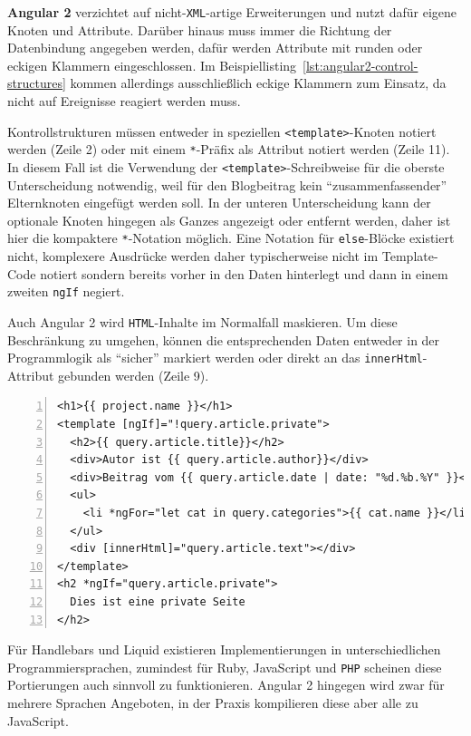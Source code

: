 \textbf{Angular 2} verzichtet auf nicht-\texttt{XML}-artige Erweiterungen und nutzt dafür eigene Knoten und Attribute. Darüber hinaus muss immer die Richtung der Datenbindung angegeben werden, dafür werden Attribute mit runden oder eckigen Klammern eingeschlossen. Im Beispiellisting~\ref{lst:angular2-control-structures} kommen allerdings ausschließlich eckige Klammern zum Einsatz, da nicht auf Ereignisse reagiert werden muss.

Kontrollstrukturen müssen entweder in speziellen \texttt{<template>}-Knoten notiert werden (Zeile 2) oder mit einem \texttt{*}-Präfix als Attribut notiert werden (Zeile 11). In diesem Fall ist die Verwendung der \texttt{<template>}-Schreibweise für die oberste Unterscheidung notwendig, weil für den Blogbeitrag kein "`zusammenfassender"' Elternknoten eingefügt werden soll. In der unteren Unterscheidung kann der optionale Knoten hingegen als Ganzes angezeigt oder entfernt werden, daher ist hier die kompaktere \texttt{*}-Notation möglich. Eine Notation für \texttt{else}-Blöcke existiert nicht, komplexere Ausdrücke werden daher typischerweise nicht im Template-Code notiert sondern bereits vorher in den Daten hinterlegt und dann in einem zweiten \texttt{ngIf} negiert.

Auch Angular 2 wird \texttt{HTML}-Inhalte im Normalfall maskieren. Um diese Beschränkung zu umgehen, können die entsprechenden Daten entweder in der Programmlogik als "`sicher"' markiert werden oder direkt an das \texttt{innerHtml}-Attribut gebunden werden (Zeile 9).

\begin{lstlisting}[float=h, numbers=left, caption={Blogartikel mit Angular 2}, label={lst:angular2-control-structures}]
<h1>{{ project.name }}</h1>
<template [ngIf]="!query.article.private">
  <h2>{{ query.article.title}}</h2>
  <div>Autor ist {{ query.article.author}}</div>
  <div>Beitrag vom {{ query.article.date | date: "%d.%b.%Y" }}</div>
  <ul>
    <li *ngFor="let cat in query.categories">{{ cat.name }}</li>
  </ul>
  <div [innerHtml]="query.article.text"></div>
</template>
<h2 *ngIf="query.article.private">
  Dies ist eine private Seite
</h2>
\end{lstlisting}

Für Handlebars und Liquid existieren Implementierungen in unterschiedlichen Programmiersprachen, zumindest für Ruby, JavaScript und \texttt{PHP} scheinen diese Portierungen auch sinnvoll zu funktionieren. Angular 2 hingegen wird zwar für mehrere Sprachen Angeboten, in der Praxis kompilieren diese aber alle zu JavaScript.


